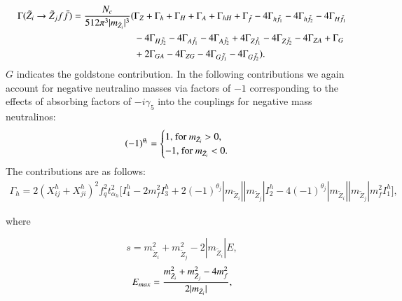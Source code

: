 \documentclass[final,3p,times,pdflatex]{elsarticle}
\begin{document}
\begin{equation} \label{neutneutff}
\begin{aligned}
\Gamma (\tilde{Z}_i \rightarrow \tilde{Z}_j f \bar{f}) = {N_{c} \over 512 \pi^3 |m_{\tilde{Z}_i}|^3}( & \Gamma_Z + \Gamma_h + \Gamma_H + \Gamma_A + \Gamma_{hH} + \Gamma_{\tilde{f}} - 4\Gamma_{h \tilde{f}_1} - 4\Gamma_{h \tilde{f}_2} - 4\Gamma_{H \tilde{f}_1} \\ & - 4\Gamma_{H \tilde{f}_2} - 4\Gamma_{A \tilde{f}_1} - 4\Gamma_{A \tilde{f}_2} + 4\Gamma_{Z \tilde{f}_1} - 4\Gamma_{Z \tilde{f}_2} - 4\Gamma_{ZA} + \Gamma_{G} \\ & + 2\Gamma_{G A} -4\Gamma_{Z G} - 4\Gamma_{G \tilde{f}_1} - 4\Gamma_{G \tilde{f}_2}).
\end{aligned}
\end{equation}
$G$ indicates the goldstone contribution.
In the following contributions we again account for negative neutralino masses via factors of $-1$ corresponding to the effects of absorbing factors of $-i\gamma_5$ into the couplings for negative mass neutralinos:
\begin{equation}
(-1)^{\theta_i} = \begin{cases}
1 $, for $m_{\tilde{Z}_i} > 0, \\
-1 $, for $m_{\tilde{Z}_i} < 0. \\
\end{cases}
\end{equation}
The contributions are as follows:
\begin{equation}
\begin{aligned}
\Gamma_h = 2(X_{ij}^h + X_{ji}^h)^2 f_{q}^2 t_{\alpha_h}^2 \Big[I_{4}^h - 2m_{f}^2 I_{3}^h + 2(-1)^{\theta_j}|m_{\tilde{Z}_i}||m_{\tilde{Z}_j}|I_{2}^h - 4(-1)^{\theta_j}|m_{\tilde{Z}_i}||m_{\tilde{Z}_j}|m_{f}^2 I_{1}^h\Big],
\end{aligned}
\end{equation}

where

\begin{equation}
s = m_{\tilde{Z}_i}^2 + m_{\tilde{Z}_j}^2 - 2|m_{\tilde{Z}_i}|E,
\end{equation}
\begin{equation}
E_{max} = {m_{\tilde{Z}_i}^2 + m_{\tilde{Z}_j}^2 - 4m_{f}^2 \over 2 |m_{\tilde{Z}_i}|},
\end{equation}
\end{document}
